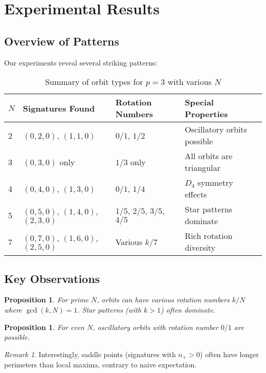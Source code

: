 \documentclass[11pt]{article}
\theoremstyle{plain}
\newtheorem{proposition}[theorem]{Proposition}
\theoremstyle{definition}
\theoremstyle{remark}
\newtheorem{remark}[theorem]{Remark}
\begin{document}
\section{Experimental Results}

\subsection{Overview of Patterns}

Our experiments reveal several striking patterns:

\begin{table}[h]
\centering
\begin{tabular}{@{}llll@{}}
\toprule
$N$ & Signatures Found & Rotation Numbers & Special Properties \\
\midrule
2 & $(0,2,0)$, $(1,1,0)$ & $0/1$, $1/2$ & Oscillatory orbits possible \\
3 & $(0,3,0)$ only & $1/3$ only & All orbits are triangular \\
4 & $(0,4,0)$, $(1,3,0)$ & $0/1$, $1/4$ & $D_4$ symmetry effects \\
5 & $(0,5,0)$, $(1,4,0)$, $(2,3,0)$ & $1/5$, $2/5$, $3/5$, $4/5$ & Star patterns dominate \\
7 & $(0,7,0)$, $(1,6,0)$, $(2,5,0)$ & Various $k/7$ & Rich rotation diversity \\
\bottomrule
\end{tabular}
\caption{Summary of orbit types for $p = 3$ with various $N$}
\end{table}

\subsection{Key Observations}

\begin{proposition}
For prime $N$, orbits can have various rotation numbers $k/N$ where $\gcd(k,N) = 1$. Star patterns (with $k > 1$) often dominate.
\end{proposition}

\begin{proposition}
For even $N$, oscillatory orbits with rotation number $0/1$ are possible.
\end{proposition}

\begin{remark}
Interestingly, saddle points (signatures with $n_+ > 0$) often have longer perimeters than local maxima, contrary to naive expectation.
\end{remark}
\end{document}
